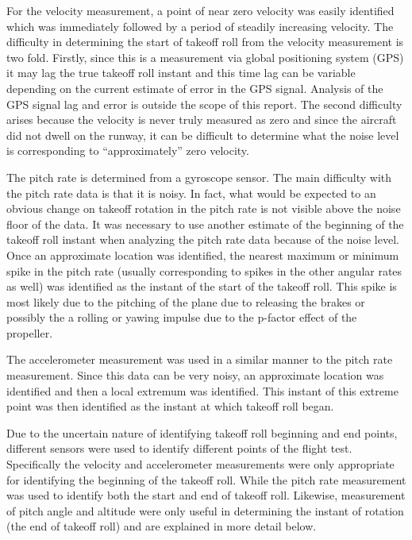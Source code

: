 \documentclass[conf]{new-aiaa}
\begin{document}
For the velocity measurement, a point of near zero velocity was easily identified which was immediately followed by a period of steadily increasing velocity. The difficulty in determining the start of takeoff roll from the velocity measurement is two fold. Firstly, since this is a measurement via global positioning system (GPS) it may lag the true takeoff roll instant and this time lag can be variable depending on the current estimate of error in the GPS signal. Analysis of the GPS signal lag and error is outside the scope of this report. The second difficulty arises because the velocity is never truly measured as zero and since the aircraft did not dwell on the runway, it can be difficult to determine what the noise level is corresponding to ``approximately'' zero velocity.

The pitch rate is determined from a gyroscope sensor. The main difficulty with the pitch rate data is that it is noisy. In fact, what would be expected to an obvious change on takeoff rotation in the pitch rate is not visible above the noise floor of the data. It was necessary to use another estimate of the beginning of the takeoff roll instant when analyzing the pitch rate data because of the noise level. Once an approximate location was identified, the nearest maximum or minimum spike in the pitch rate (usually corresponding to spikes in the other angular rates as well) was identified as the instant of the start of the takeoff roll. This spike is most likely due to the pitching of the plane due to releasing the brakes or possibly the a rolling or yawing impulse due to the p-factor effect of the propeller.

The accelerometer measurement was used in a similar manner to the pitch rate measurement. Since this data can be very noisy, an approximate location was identified and then a local extremum was identified. This instant of this extreme point was then identified as the instant at which takeoff roll began.

Due to the uncertain nature of identifying takeoff roll beginning and end points, different sensors were used to identify different points of the flight test. Specifically the velocity and accelerometer measurements were only appropriate for identifying the beginning of the takeoff roll. While the pitch rate measurement was used to identify both the start and end of takeoff roll. Likewise, measurement of pitch angle and altitude were only useful in determining the instant of rotation (the end of takeoff roll) and are explained in more detail below.
\end{document}
